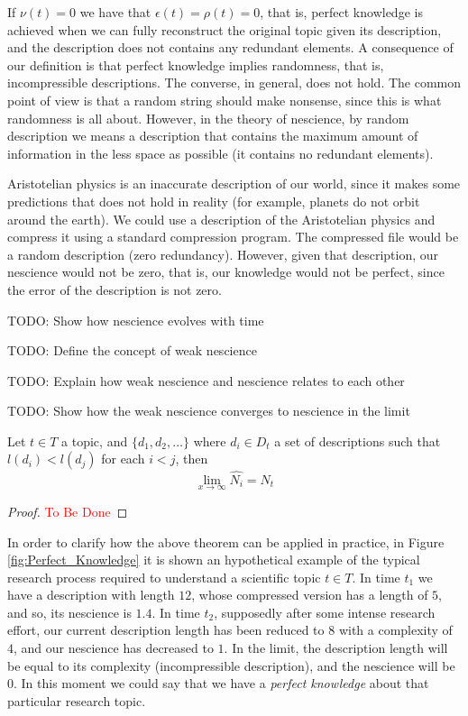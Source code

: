 If $\nu(t)=0$ we have that $\epsilon(t) = \rho(t) = 0$, that is, perfect knowledge is achieved when we can fully reconstruct the original topic given its description, and the description does not contains any redundant elements. A consequence of our definition is that perfect knowledge implies randomness, that is, incompressible descriptions. The converse, in general, does not hold. The common point of view is that a random string should make nonsense, since this is what randomness is all about. However, in the theory of nescience, by random description we means a description that contains the maximum amount of information in the less space as possible (it contains no redundant elements).

\begin{example}
Aristotelian physics is an inaccurate description of our world, since it makes some predictions that does not hold in reality (for example, planets do not orbit around the earth). We could use a description of the Aristotelian physics and compress it using a standard compression program. The compressed file would be a random description (zero redundancy). However, given that description, our nescience would not be zero, that is, our knowledge would not be perfect, since the error of the description is not zero.
\end{example}

{\color{red} TODO: Show how nescience evolves with time}

{\color{red} TODO: Define the concept of weak nescience}

{\color{red} TODO: Explain how weak nescience and nescience relates to each other}

{\color{red} TODO: Show how the weak nescience converges to nescience in the limit}

\begin{theorem}
Let $t\in T$ a topic, and $\{d_1, d_2, \ldots \}$ where $d_i \in D_t$ a set of descriptions such that $ l(d_i) < l(d_j)$ for each $i < j$, then
\[
\lim_{x \to \infty} \hat{N_i} = N_t
\]
\end{theorem}
\begin{proof}
\textcolor{red}{To Be Done}
\end{proof}

\begin{example}
In order to clarify how the above theorem can be applied in practice, in Figure \ref{fig:Perfect_Knowledge} it is shown an hypothetical example of the typical research process required to understand a scientific topic $t\in T$. In time $t_{1}$ we have a description with length $12$, whose compressed version has a length of $5$, and so, its nescience is $1.4$. In time $t_{2}$, supposedly after some intense research effort, our current description length has been reduced to $8$ with a complexity of $4$, and our nescience has decreased to $1$. In the limit, the description length will be equal to its complexity (incompressible description), and the nescience will be 0. In this moment we could say that we have a \emph{perfect knowledge} about that particular research topic.
\end{example}

